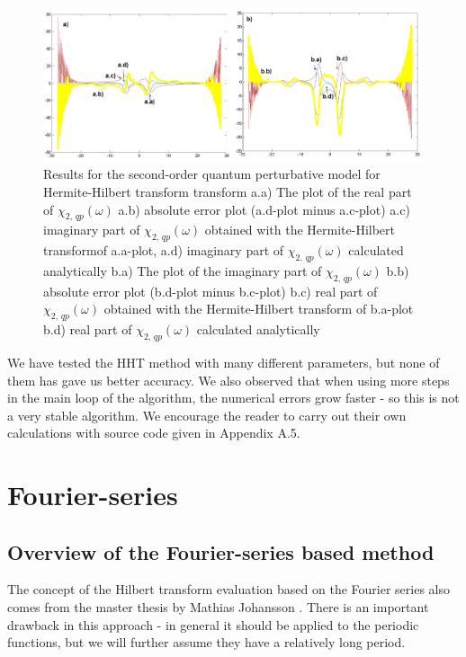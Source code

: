 \documentclass[12pt,twoside,a4paper]{article}
\numberwithin{equation}{subsection}
\numberwithin{figure}{subsection}
\begin{document}
\begin{figure} 
  \includegraphics[width=150mm]{img/hht_qp2.png}
  \caption{Results for the second-order quantum perturbative model for Hermite-Hilbert transform transform
     a.a) The plot of the real part of ${\chi_{2, \,qp}}(\omega )$
     a.b) absolute error plot (a.d-plot minus a.c-plot)
     a.c) imaginary part of ${\chi_{2, \,qp}}(\omega )$ obtained with the Hermite-Hilbert transformof a.a-plot, 
     a.d) imaginary part of ${\chi_{2, \,qp}}(\omega )$ calculated analytically 
     b.a) The plot of the imaginary part of ${\chi_{2, \,qp}}(\omega )$ 
     b.b) absolute error plot (b.d-plot minus b.c-plot)
     b.c) real part of ${\chi_{2, \,qp}}(\omega )$ obtained with the Hermite-Hilbert transform of b.a-plot 
     b.d) real part of $\chi_{2, \,qp} (\omega )$ calculated analytically 
     \label{fig:hht_qp2}
     }
\end{figure} 

We have tested the HHT method with many different parameters, but none of them has gave us better accuracy. We also observed that when using more steps in the main loop of the algorithm, the numerical errors grow faster - so this is not a very stable algorithm. We encourage the reader to carry out their own calculations with source code given in Appendix A.5.

\section{Fourier-series} \label{chap:fourier}

\subsection{Overview of the Fourier-series based method}  \label{chap:fourier_overview}

The concept of the Hilbert transform evaluation based on the Fourier series also comes from the master thesis by Mathias Johansson \cite{johansson_hilbert}. There is an important drawback in this approach - in general it should be applied to the periodic functions, but we will further assume they have a relatively long period. 
\end{document}
